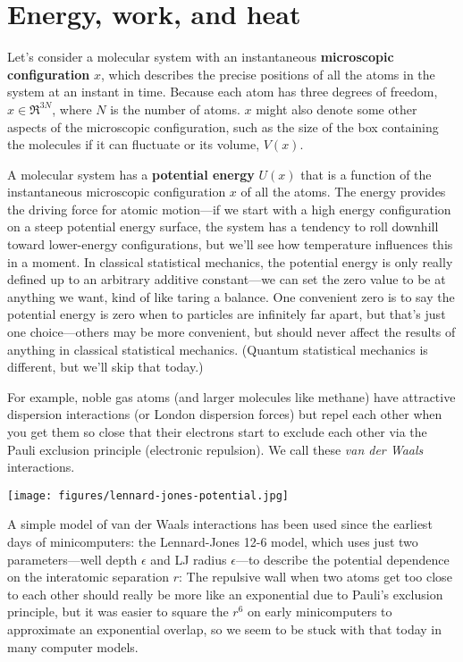 \documentclass[english,course]{lecture}
\begin{document}
\section{Energy, work, and heat}

Let's consider a molecular system with an instantaneous {\bf microscopic configuration} $x$, which describes the precise positions of all the atoms in the system at an instant in time.
Because each atom has three degrees of freedom, $x \in \Re^{3N}$, where $N$ is the number of atoms.
$x$ might also denote some other aspects of the microscopic configuration, such as the size of the box containing the molecules if it can fluctuate or its volume, $V(x)$.

A molecular system has a {\bf potential energy} $U(x)$ that is a function of the instantaneous microscopic configuration $x$ of all the atoms.
The energy provides the driving force for atomic motion---if we start with a high energy configuration on a steep potential energy surface, the system has a tendency to roll downhill toward lower-energy configurations, but we'll see how temperature influences this in a moment.
In classical statistical mechanics, the potential energy is only really defined up to an arbitrary additive constant---we can set the zero value to be at anything we want, kind of like taring a balance. 
One convenient zero is to say the potential energy is zero when to particles are infinitely far apart, but that's just one choice---others may be more convenient, but should never affect the results of anything in classical statistical mechanics. 
(Quantum statistical mechanics is different, but we'll skip that today.)

For example, noble gas atoms (and larger molecules like methane) have attractive dispersion interactions (or London dispersion forces) but repel each other when you get them so close that their electrons start to exclude each other via the Pauli exclusion principle (electronic repulsion).
We call these \emph{van der Waals} interactions.

\begin{centering}
\texttt{[image: figures/lennard-jones-potential.jpg]}

\end{centering}

A simple model of van der Waals interactions has been used since the earliest days of minicomputers: the Lennard-Jones 12-6 model, which uses just two parameters---well depth $\epsilon$ and LJ radius $\epsilon$---to describe the potential dependence on the interatomic separation $r$:
The repulsive wall when two atoms get too close to each other should really be more like an exponential due to Pauli's exclusion principle, but it was easier to square the $r^6$ on early minicomputers to approximate an exponential overlap, so we seem to be stuck with that today in many computer models.
\end{document}

